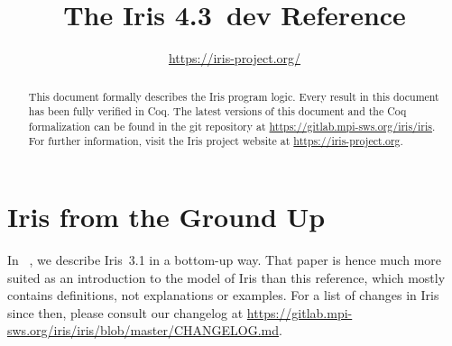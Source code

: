 \documentclass[10pt]{article}
\title{\bfseries The Iris 4.3~dev Reference}
\author{\url{https://iris-project.org/}}
\begin{document}
\maketitle
\thispagestyle{empty}
\vfill
\begin{abstract}
This document formally describes the Iris program logic.
Every result in this document has been fully verified in Coq.
The latest versions of this document and the Coq formalization can be found in the git repository at \url{https://gitlab.mpi-sws.org/iris/iris}.
For further information, visit the Iris project website at \url{https://iris-project.org}.
\end{abstract}

\clearpage\begingroup
\tableofcontents
\endgroup

\clearpage\begingroup
\section{Iris from the Ground Up}
In ~\cite{iris-ground-up}, we describe Iris~3.1 in a bottom-up way.
That paper is hence much more suited as an introduction to the model of Iris than this reference, which mostly contains definitions, not explanations or examples.
For a list of changes in Iris since then, please consult our changelog at \url{https://gitlab.mpi-sws.org/iris/iris/blob/master/CHANGELOG.md}.
\endgroup

\clearpage\begingroup

\endgroup
\clearpage\begingroup

\endgroup
\clearpage\begingroup

\endgroup
\clearpage\begingroup

\endgroup
\clearpage\begingroup

\endgroup
\clearpage\begingroup

\endgroup
\clearpage\begingroup

\endgroup
\clearpage\begingroup

\endgroup
\clearpage\begingroup

\endgroup
\clearpage\begingroup

\endgroup
\clearpage\begingroup
\printbibliography
\endgroup
\end{document}
